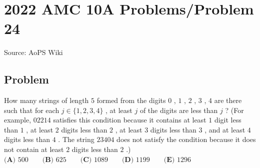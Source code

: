 \documentclass[12pt]{article}
\begin{document}
\section*{{2022 AMC 10A Problems/Problem 24}}
Source: AoPS Wiki

\subsection*{Problem}
How many strings of length $5$ formed from the digits $0$ , $1$ , $2$ , $3$ , $4$ are there such that for each $j \in \{1,2,3,4\}$ , at least $j$ of the digits are less than $j$ ? (For example, $02214$ satisfies this condition
because it contains at least $1$ digit less than $1$ , at least $2$ digits less than $2$ , at least $3$ digits less
than $3$ , and at least $4$ digits less than $4$ . The string $23404$ does not satisfy the condition because it
does not contain at least $2$ digits less than $2$ .) $\textbf{(A) }500\qquad\textbf{(B) }625\qquad\textbf{(C) }1089\qquad\textbf{(D) }1199\qquad\textbf{(E) }1296$
\end{document}
